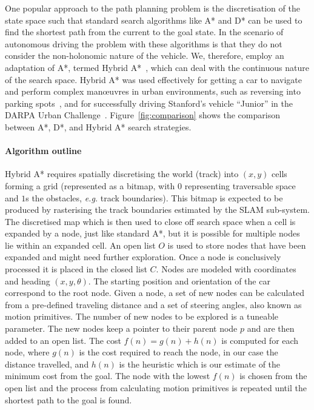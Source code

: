 \documentclass[a4paper, 10pt, conference]{ieeeconf}      %
\begin{document}
One popular approach to the path planning problem is the discretisation of the
state space such that standard search algorithms like A* and D* can be
used to find the shortest path from the current to the goal state. In the
scenario of autonomous driving the problem with these
algorithms is that they do not consider the non-holonomic nature of the vehicle.
We, therefore, employ an adaptation of A*, termed Hybrid A*~\cite{dolgov08}, which
can deal with the continuous nature of the search space. Hybrid A* was
used effectively for getting a car to navigate and perform complex man\oe{}uvres in urban environments, such as reversing into
parking spots~\cite{petereit12}, and for successfully driving Stanford’s
vehicle ``Junior'' in the DARPA Urban
Challenge~\cite{montemerlo08}. Figure~\cref{fig:comparison} shows the
comparison between A*, D*, and Hybrid A* search strategies.

\paragraph*{Algorithm outline}
Hybrid A* requires spatially discretising the world (track) into $(x, y)$
cells forming a grid (represented as a bitmap, with $0$ representing
traversable space and $1$s the obstacles, \emph{e.g.} track boundaries). This
bitmap is expected to be produced by rasterising the track boundaries
estimated by the SLAM sub-system.  The discretised map which is then used to
close off search space when a cell is expanded by a node, just like standard
A*, but it is possible for multiple nodes lie within an expanded cell.  An
open list $O$ is used to store nodes that have been expanded and might need
further exploration. Once a node is conclusively processed it is placed in the
closed list $C$. Nodes are modeled with coordinates and heading
$(x, y, \theta)$. The starting position and orientation of the car correspond
to the root node. Given a node, a set of new nodes can be calculated from a
pre-defined traveling distance and a set of steering angles, also known as
motion primitives. The number of new nodes to be explored is a tuneable
parameter. The new nodes keep a pointer to their parent node $p$ and are then
added to an open list. The cost $f(n) = g(n)+h(n)$ is computed for each node,
where $g(n)$ is the cost required to reach the node, in our case the distance
travelled, and $h(n)$ is the heuristic which is our estimate of the minimum
cost from the goal. The node with the lowest $f(n)$ is chosen from the open
list and the process from calculating motion primitives is repeated until the
shortest path to the goal is found.
\end{document}
